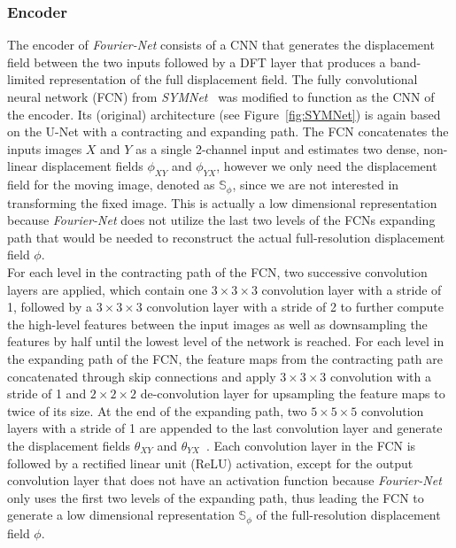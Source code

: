 \subsubsection{Encoder}	\label{SubSubSec:Encoder}
The encoder of \emph{Fourier-Net} consists of a CNN that generates the displacement field between the two inputs followed by a DFT layer that produces a band-limited representation of the full displacement field. The fully convolutional neural network (FCN) from \emph{SYMNet}~\cite{SYM-Net} was modified to function as the CNN of the encoder. Its (original) architecture (see Figure~\ref{fig:SYMNet}) is again based on the U-Net with a contracting and expanding path. The FCN concatenates the inputs images $X$ and $Y$ as a single 2-channel input and estimates two dense, non-linear displacement fields $\phi_{XY}$ and $\phi_{YX}$, however we only need the displacement field for the moving image, denoted as $\mathbb{S}_\phi$, since we are not interested in transforming the fixed image. This is actually a low dimensional representation because \emph{Fourier-Net} does not utilize the last two levels of the FCNs expanding path that would be needed to reconstruct the actual full-resolution displacement field $\phi$.\\
For each level in the contracting path of the FCN, two successive convolution layers are applied, which contain one $3 \times 3 \times 3$ convolution layer with a stride of 1, followed by a $3 \times 3 \times 3$ convolution layer with a stride of 2 to further compute the high-level features between the input images as well as downsampling the features by half until the lowest level of the network is reached. For each level in the expanding path of the FCN, the feature maps from the contracting path are concatenated through skip connections and apply $3 \times 3 \times 3$ convolution with a stride of 1 and $2 \times 2 \times 2$ de-convolution layer for upsampling the feature maps to twice of its size. At the end of the expanding path, two $5 \times 5 \times 5$ convolution layers with a stride of 1 are appended to the last convolution layer and generate the displacement fields $\theta_{XY}$ and $\theta_{YX}$~\cite{SYM-Net}. Each convolution layer in the FCN is followed by a rectified linear unit (ReLU) activation, except for the output convolution layer that does not have an activation function because \emph{Fourier-Net} only uses the first two levels of the expanding path, thus leading the FCN to generate a low dimensional representation $\mathbb{S}_\phi$ of the full-resolution displacement field $\phi$.\\
